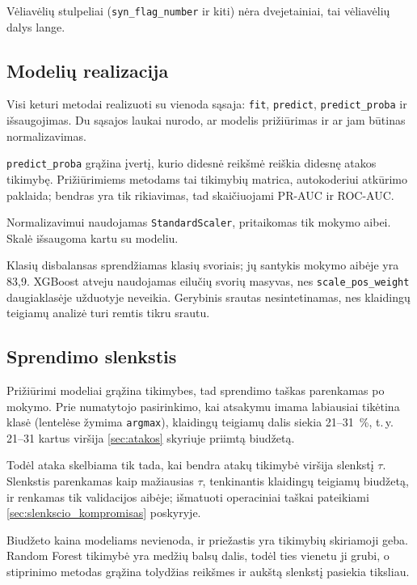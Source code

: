 Vėliavėlių stulpeliai (\texttt{syn\_flag\_number} ir kiti) nėra
dvejetainiai, tai vėliavėlių dalys lange.


\subsection{Modelių realizacija}
\label{sec:sasaja}

Visi keturi metodai realizuoti su vienoda sąsaja: \texttt{fit},
\texttt{predict}, \texttt{predict\_proba} ir išsaugojimas. Du sąsajos
laukai nurodo, ar modelis prižiūrimas ir ar jam būtinas normalizavimas.

\texttt{predict\_proba} grąžina įvertį, kurio didesnė reikšmė reiškia
didesnę atakos tikimybę. Prižiūrimiems metodams tai tikimybių matrica,
autokoderiui atkūrimo paklaida; bendras yra tik rikiavimas, tad
skaičiuojami PR-AUC ir ROC-AUC.

Normalizavimui naudojamas \texttt{StandardScaler}, pritaikomas tik
mokymo aibei. Skalė išsaugoma kartu su modeliu.

Klasių disbalansas sprendžiamas klasių svoriais; jų santykis mokymo
aibėje yra 83,9. XGBoost atveju naudojamas eilučių svorių masyvas, nes
\texttt{scale\_pos\_weight} daugiaklasėje užduotyje neveikia. Gerybinis
srautas nesintetinamas, nes klaidingų teigiamų analizė turi remtis tikru
srautu.


\subsection{Sprendimo slenkstis}
\label{sec:slenkstis}

Prižiūrimi modeliai grąžina tikimybes, tad sprendimo taškas parenkamas
po mokymo. Prie numatytojo pasirinkimo, kai atsakymu imama labiausiai tikėtina
klasė (lentelėse žymima \texttt{argmax}), klaidingų teigiamų dalis
siekia 21--31~\%, t.\,y. 21--31 kartus viršija
\ref{sec:atakos} skyriuje priimtą biudžetą.

Todėl ataka skelbiama tik tada, kai bendra atakų tikimybė viršija
slenkstį $\tau$. Slenkstis parenkamas kaip mažiausias $\tau$,
tenkinantis klaidingų teigiamų biudžetą, ir renkamas tik validacijos
aibėje; išmatuoti operaciniai taškai pateikiami
\ref{sec:slenkscio_kompromisas} poskyryje.

Biudžeto kaina modeliams nevienoda, ir priežastis yra tikimybių
skiriamoji geba. Random Forest tikimybė yra medžių balsų dalis, todėl
ties vienetu ji grubi, o stiprinimo metodas grąžina tolydžias reikšmes
ir aukštą slenkstį pasiekia tiksliau.

